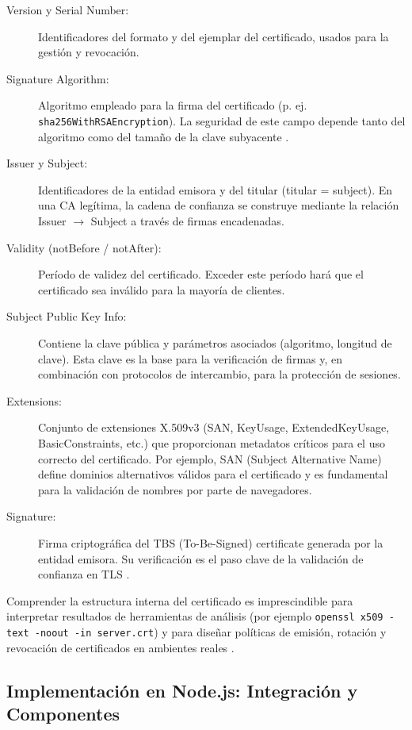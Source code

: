 \begin{description}
    \item[Version y Serial Number:] Identificadores del formato y del ejemplar del certificado, usados para la gestión y revocación.
    \item[Signature Algorithm:] Algoritmo empleado para la firma del certificado (p. ej. \texttt{sha256WithRSAEncryption}). La seguridad de este campo depende tanto del algoritmo como del tamaño de la clave subyacente \cite{rfc5280}.
    \item[Issuer y Subject:] Identificadores de la entidad emisora y del titular (titular = subject). En una CA legítima, la cadena de confianza se construye mediante la relación Issuer $\rightarrow$ Subject a través de firmas encadenadas.
    \item[Validity (notBefore / notAfter):] Período de validez del certificado. Exceder este período hará que el certificado sea inválido para la mayoría de clientes.
    \item[Subject Public Key Info:] Contiene la clave pública y parámetros asociados (algoritmo, longitud de clave). Esta clave es la base para la verificación de firmas y, en combinación con protocolos de intercambio, para la protección de sesiones.
    \item[Extensions:] Conjunto de extensiones X.509v3 (SAN, KeyUsage, ExtendedKeyUsage, BasicConstraints, etc.) que proporcionan metadatos críticos para el uso correcto del certificado. Por ejemplo, SAN (Subject Alternative Name) define dominios alternativos válidos para el certificado y es fundamental para la validación de nombres por parte de navegadores.
    \item[Signature:] Firma criptográfica del TBS (To-Be-Signed) certificate generada por la entidad emisora. Su verificación es el paso clave de la validación de confianza en TLS \cite{rfc5280}.
\end{description}

Comprender la estructura interna del certificado es imprescindible para interpretar resultados de herramientas de análisis (por ejemplo \texttt{openssl x509 -text -noout -in server.crt}) y para diseñar políticas de emisión, rotación y revocación de certificados en ambientes reales \cite{liu2015}.

\bigskip

\subsection{Implementación en Node.js: Integración y Componentes}
\label{subsec:implementacion_nodejs}

